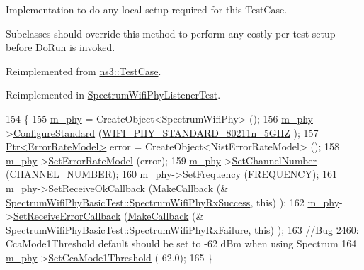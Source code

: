 Implementation to do any local setup required for this Test\+Case. 

Subclasses should override this method to perform any costly per-\/test setup before Do\+Run is invoked. 

Reimplemented from \hyperlink{classns3_1_1TestCase_a4a7e32ad32a10a508910815cd38e9177}{ns3\+::\+Test\+Case}.



Reimplemented in \hyperlink{classSpectrumWifiPhyListenerTest_a2649c02c0afb6632b514e9f81ad77cb9}{Spectrum\+Wifi\+Phy\+Listener\+Test}.


\begin{DoxyCode}
154 \{
155   \hyperlink{classSpectrumWifiPhyBasicTest_aea1ad31a982e7321017675c050488bd6}{m\_phy} = CreateObject<SpectrumWifiPhy> ();
156   \hyperlink{classSpectrumWifiPhyBasicTest_aea1ad31a982e7321017675c050488bd6}{m\_phy}->\hyperlink{classns3_1_1WifiPhy_aeafbea9bd8c1ae20f85584f55d868d23}{ConfigureStandard} (\hyperlink{group__wifi_gga1299834f4e1c615af3ca738033b76a49aaabe94a0be4668583c42595437b4a6c0}{WIFI\_PHY\_STANDARD\_80211n\_5GHZ}
      );
157   \hyperlink{classns3_1_1Ptr}{Ptr<ErrorRateModel>} error = CreateObject<NistErrorRateModel> ();
158   \hyperlink{classSpectrumWifiPhyBasicTest_aea1ad31a982e7321017675c050488bd6}{m\_phy}->\hyperlink{classns3_1_1WifiPhy_ac363f667899a813bb1331225bc1c1474}{SetErrorRateModel} (error);
159   \hyperlink{classSpectrumWifiPhyBasicTest_aea1ad31a982e7321017675c050488bd6}{m\_phy}->\hyperlink{classns3_1_1WifiPhy_a2d13cf6ae4c185cae8516516afe4a32a}{SetChannelNumber} (\hyperlink{spectrum-wifi-phy-test_8cc_a2040715c66f41d2aeb803276c77619c4}{CHANNEL\_NUMBER});
160   \hyperlink{classSpectrumWifiPhyBasicTest_aea1ad31a982e7321017675c050488bd6}{m\_phy}->\hyperlink{classns3_1_1WifiPhy_afecd69b20631e112aa863dbed4c4bd22}{SetFrequency} (\hyperlink{spectrum-wifi-phy-test_8cc_ad1a292c96f313d36071b5faf0377f606}{FREQUENCY});
161   \hyperlink{classSpectrumWifiPhyBasicTest_aea1ad31a982e7321017675c050488bd6}{m\_phy}->\hyperlink{classns3_1_1WifiPhy_adc3aa3a59f36e5c84f8d759bb15a5bf0}{SetReceiveOkCallback} (\hyperlink{group__makecallbackmemptr_ga9376283685aa99d204048d6a4b7610a4}{MakeCallback} (&
      \hyperlink{classSpectrumWifiPhyBasicTest_a1aca75f1b9b01f5f3e6843a4f4210854}{SpectrumWifiPhyBasicTest::SpectrumWifiPhyRxSuccess}, \textcolor{keyword}{this})
      );
162   \hyperlink{classSpectrumWifiPhyBasicTest_aea1ad31a982e7321017675c050488bd6}{m\_phy}->\hyperlink{classns3_1_1WifiPhy_a50d71b88c866ecfc18cd4006f1a9d2ae}{SetReceiveErrorCallback} (\hyperlink{group__makecallbackmemptr_ga9376283685aa99d204048d6a4b7610a4}{MakeCallback} (&
      \hyperlink{classSpectrumWifiPhyBasicTest_ab8d57c5b8063fb9ae4d46cb0e09246b6}{SpectrumWifiPhyBasicTest::SpectrumWifiPhyRxFailure}, \textcolor{keyword}{this})
      );
163   \textcolor{comment}{//Bug 2460: CcaMode1Threshold default should be set to -62 dBm when using Spectrum}
164   \hyperlink{classSpectrumWifiPhyBasicTest_aea1ad31a982e7321017675c050488bd6}{m\_phy}->\hyperlink{classns3_1_1WifiPhy_a66c57f8c7bc8b995e98a25a3f9c82fd9}{SetCcaMode1Threshold} (-62.0);
165 \}
\end{DoxyCode}


